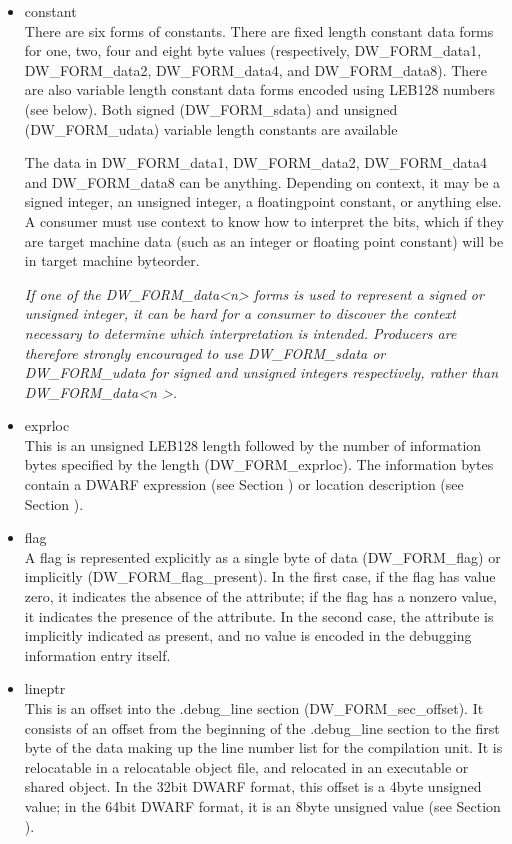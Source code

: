\begin{itemize}
\item constant \\
There are six forms of constants. There are fixed length
constant data forms for one, two, four and eight byte values
(respectively, DW\_FORM\_data1, DW\_FORM\_data2, DW\_FORM\_data4,
and DW\_FORM\_data8). There are also variable length constant
data forms encoded using LEB128 numbers (see below). Both
signed (DW\_FORM\_sdata) and unsigned (DW\_FORM\_udata) variable
length constants are available

The data in DW\_FORM\_data1, DW\_FORM\_data2, DW\_FORM\_data4 and
DW\_FORM\_data8 can be anything. Depending on context, it may
be a signed integer, an unsigned integer, a floating\dash point
constant, or anything else. A consumer must use context to
know how to interpret the bits, which if they are target
machine data (such as an integer or floating point constant)
will be in target machine byte\dash order.

\textit{If one of the DW\_FORM\_data<n> forms is used to represent a
signed or unsigned integer, it can be hard for a consumer
to discover the context necessary to determine which
interpretation is intended. Producers are therefore strongly
encouraged to use DW\_FORM\_sdata or DW\_FORM\_udata for signed and
unsigned integers respectively, rather than 
DW\_FORM\_data\textless n \textgreater.}


\item exprloc \\
This is an unsigned LEB128 length followed by the
number of information bytes specified by the length
(DW\_FORM\_exprloc). The information bytes contain a DWARF
expression 
(see Section ) 
or location description 
(see Section ).

\item flag \\
A flag is represented explicitly as a single byte of data
(DW\_FORM\_flag) or implicitly (DW\_FORM\_flag\_present). In the
first case, if the flag has value zero, it indicates the
absence of the attribute; if the flag has a non\dash zero value,
it indicates the presence of the attribute. In the second
case, the attribute is implicitly indicated as present, and
no value is encoded in the debugging information entry itself.

\item lineptr \\
This is an offset into the .debug\_line section
(DW\_FORM\_sec\_offset). It consists of an offset from the
beginning of the .debug\_line section to the first byte of
the data making up the line number list for the compilation
unit. 
It is relocatable in a relocatable object file, and
relocated in an executable or shared object. In the 32\dash bit
DWARF format, this offset is a 4\dash byte unsigned value;
in the 64\dash bit DWARF format, it is an 8\dash byte unsigned value
(see Section ).



\end{itemize}
